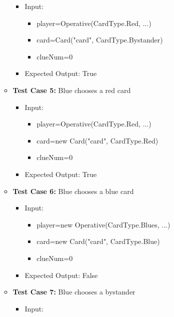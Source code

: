 \documentclass[12pt]{article}
\begin{document}
\begin{itemize}
\begin{itemize}
            \begin{itemize}
            \item Input:
                \begin{itemize}
                    \item player=Operative(CardType.Red, ...)
                    \item card=Card("card", CardType.Bystander)
                    \item clueNum=0
                \end{itemize}
            \item Expected Output: True
        \end{itemize}
        \item \textbf{Test Case 5:} Blue chooses a red card
            \begin{itemize}
            \item Input:
                \begin{itemize}
                    \item player=Operative(CardType.Red, ...)
                    \item card=new Card("card", CardType.Red)
                    \item clueNum=0
                \end{itemize}
            \item Expected Output: True
        \end{itemize}
        \item \textbf{Test Case 6:} Blue chooses a blue card
            \begin{itemize}
            \item Input:
                \begin{itemize}
                    \item player=new Operative(CardType.Blues, ...)
                    \item card=new Card("card", CardType.Blue)
                    \item clueNum=0
                \end{itemize}
            \item Expected Output: False
        \end{itemize}
        \item \textbf{Test Case 7:} Blue chooses a bystander
            \begin{itemize}
            \item Input:
                \begin{itemize}

\end{itemize}
\end{itemize}
\end{itemize}
\end{itemize}
\end{document}
